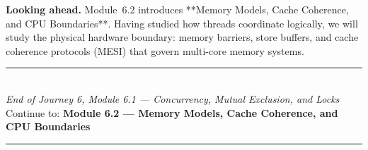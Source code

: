 \documentclass[12pt, a4paper]{book}
\begin{document}
\medskip
\noindent\textbf{Looking ahead.}
Module~6.2 introduces **Memory Models, Cache Coherence, and CPU Boundaries**. Having studied how threads coordinate logically, we will study the physical hardware boundary: memory barriers, store buffers, and cache coherence protocols (MESI) that govern multi-core memory systems.

\vspace{1.4cm}
\begin{center}
{\color{JourneyColor}\rule{0.5\linewidth}{0.8pt}}\\[6pt]
{\small\color{JourneyColor}\textit{End of Journey 6, Module 6.1 --- Concurrency, Mutual Exclusion, and Locks}}\\[4pt]
{\small\color{JourneyColor}Continue to: \textbf{Module 6.2 --- Memory Models, Cache Coherence, and CPU Boundaries}}\\[6pt]
{\color{JourneyColor}\rule{0.5\linewidth}{0.8pt}}
\end{center}
\end{document}

